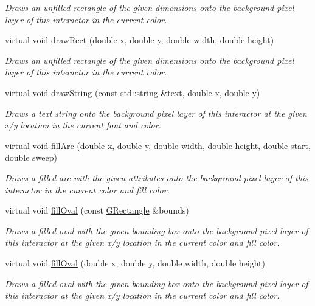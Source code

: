 \begin{DoxyCompactItemize}
\begin{DoxyCompactList}\small\item\em Draws an unfilled rectangle of the given dimensions onto the background pixel layer of this interactor in the current color. \end{DoxyCompactList}\item 
virtual void \mbox{\hyperlink{classGDrawingSurface_a4148e770ffc5474153aadd4814dbd708}{draw\+Rect}} (double x, double y, double width, double height)
\begin{DoxyCompactList}\small\item\em Draws an unfilled rectangle of the given dimensions onto the background pixel layer of this interactor in the current color. \end{DoxyCompactList}\item 
virtual void \mbox{\hyperlink{classGDrawingSurface_ad4e8551a753a77135792bbee97013675}{draw\+String}} (const std\+::string \&text, double x, double y)
\begin{DoxyCompactList}\small\item\em Draws a text string onto the background pixel layer of this interactor at the given x/y location in the current font and color. \end{DoxyCompactList}\item 
virtual void \mbox{\hyperlink{classGDrawingSurface_a228075ad18bd97b57f9956568c4773f3}{fill\+Arc}} (double x, double y, double width, double height, double start, double sweep)
\begin{DoxyCompactList}\small\item\em Draws a filled arc with the given attributes onto the background pixel layer of this interactor in the current color and fill color. \end{DoxyCompactList}\item 
virtual void \mbox{\hyperlink{classGDrawingSurface_a1ea6e48d59fb588797dba4deab1397e0}{fill\+Oval}} (const \mbox{\hyperlink{classGRectangle}{G\+Rectangle}} \&bounds)
\begin{DoxyCompactList}\small\item\em Draws a filled oval with the given bounding box onto the background pixel layer of this interactor at the given x/y location in the current color and fill color. \end{DoxyCompactList}\item 
virtual void \mbox{\hyperlink{classGDrawingSurface_a28c700c82f31cd328a4629273420ee61}{fill\+Oval}} (double x, double y, double width, double height)
\begin{DoxyCompactList}\small\item\em Draws a filled oval with the given bounding box onto the background pixel layer of this interactor at the given x/y location in the current color and fill color. \end{DoxyCompactList}\item 

\end{DoxyCompactItemize}
